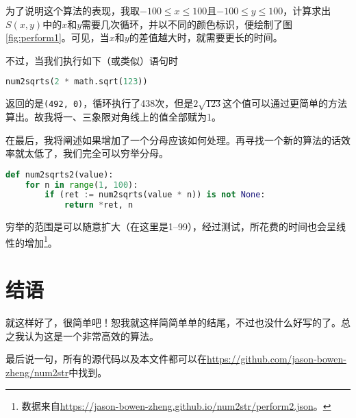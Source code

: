 \documentclass[a4paper, UTF8]{ctexart}
\begin{document}
为了说明这个算法的表现，我取$-100\leq x\leq100$且$-100\leq y\leq100$，计算求出$S(x,y)$中的$x$和$y$需要几次循环，并以不同的颜色标识，便绘制了图\ref{fig:perform1}。可见，当$x$和$y$的差值越大时，就需要更长的时间。

不过，当我们执行如下（或类似）语句时
\begin{lstlisting}[language=python]
num2sqrts(2 * math.sqrt(123))
\end{lstlisting}
返回的是\verb|(492, 0)|，循环执行了438次，但是$2\sqrt{123}$这个值可以通过更简单的方法算出。故我将一、三象限对角线上的值全部赋为1。

在最后，我将阐述如果增加了一个分母应该如何处理。再寻找一个新的算法的话效率就太低了，我们完全可以穷举分母。
\begin{lstlisting}[language=python, name=example2]
def num2sqrts2(value):
    for n in range(1, 100):
        if (ret := num2sqrts(value * n)) is not None:
            return *ret, n
\end{lstlisting}
穷举的范围是可以随意扩大（在这里是1--99），经过测试，所花费的时间也会呈线性的增加\footnote{数据来自\url{https://jason-bowen-zheng.github.io/num2str/perform2.json}。}。

\section{结语}
就这样好了，很简单吧！恕我就这样简简单单的结尾，不过也没什么好写的了。总之我认为这是一个非常高效的算法。

最后说一句，所有的源代码以及本文件都可以在\url{https://github.com/jason-bowen-zheng/num2str}中找到。
\end{document}
